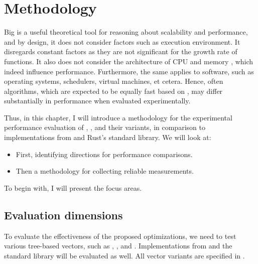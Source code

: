 
\chapter{Methodology}
\label{chapter:methodology}

Big \bigochar{} is a useful theoretical tool for reasoning about scalability and performance, and by design, it does not consider factors such as execution environment. It disregards constant factors as they are not significant for the growth rate of functions. It also does not consider the architecture of CPU and memory \cite{what-programmer-should-know-about-memory}, which indeed influence performance. Furthermore, the same applies to software, such as operating systems, schedulers, virtual machines, et cetera. Hence, often algorithms, which are expected to be equally fast based on \bigochar{}, may differ substantially in performance when evaluated experimentally.

Thus, in this chapter, I will introduce a methodology for the experimental performance evaluation of \rrbvec{}, \pvec{}, and their variants, in comparison to implementations from \imrsvec{} and Rust's standard library. We will look at:

\begin{itemize}
    \item First, identifying directions for performance comparisons.
    \item Then a methodology for collecting reliable measurements.
\end{itemize}

To begin with, I will present the focus areas.

\section{Evaluation dimensions}
To evaluate the effectiveness of the proposed optimizations, we need to test various tree-based vectors, such as \rbvec{}, \rrbvec{}, and \pvec{}. Implementations from \imrsvec{} and the standard library will be evaluated as well. All vector variants are specified in .

